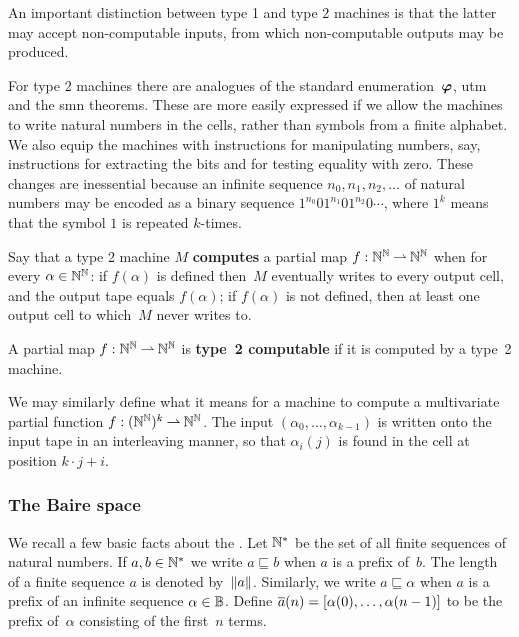 An important distinction between type 1 and type 2 machines is that
the latter may accept non-computable inputs, from which non-computable
outputs may be produced.

For type 2 machines there are analogues of the standard
enumeration~$\text{\boldmath{$\varphi$}}$, utm and the smn theorems. These are more easily
expressed if we allow the machines to write natural numbers in the
cells, rather than symbols from a finite alphabet. We also equip the
machines with instructions for manipulating numbers, say, instructions
for extracting the bits and for testing equality with zero. These
changes are inessential because an infinite sequence $n_0, n_1, n_2,
\ldots$ of natural numbers may be encoded as a binary sequence
$1^{n_0}01^{n_1}01^{n_2}0\cdots$, where $1^k$ means that the symbol
$1$ is repeated $k$-times.

\begin{definition}
  Say that a type 2 machine $M$ \textbf{computes} a partial map $f : \mathbb{N}^{\mathbb{N}} \mathbin{\rightharpoonup}
  \mathbb{N}^{\mathbb{N}}$ when for every $\alpha \in \mathbb{N}^{\mathbb{N}}$:
  if $f(\alpha)$ is defined then~$M$ eventually writes to every output cell, and the output tape equals $f(\alpha)$; if $f(\alpha)$ is not defined, then at least one output cell to which~$M$ never writes to.

  A partial map $f : \mathbb{N}^{\mathbb{N}} \mathbin{\rightharpoonup} \mathbb{N}^{\mathbb{N}}$ is \textbf{type~2 computable} if it is computed by a type~2 machine.
\end{definition}

We may similarly define what it means for a machine to compute a multivariate partial function $f : (\mathbb{N}^{\mathbb{N}})^k \mathbin{\rightharpoonup} \mathbb{N}^{\mathbb{N}}$. The input $(\alpha_0, \ldots, \alpha_{k-1})$ is written onto the input tape in an interleaving manner, so that $\alpha_i(j)$ is found in the cell at position $k \cdot j + i$.

\subsubsection{The Baire space}
\label{sec:baire-space}

We recall a few basic facts about the . Let $\mathbb{N}^{*}$ be the set of all finite sequences of natural numbers. If $a, b \in \mathbb{N}^{*}$
we write $a \sqsubseteq b$ when $a$ is a prefix of~$b$. The length of a finite sequence $a$ is denoted by~$\|a\|$. Similarly, we write $a \sqsubseteq \alpha$ when $a$ is a prefix of an infinite sequence $\alpha \in \mathbb{B}$. Define $\overline{a}(n) = [\alpha(0), \ldots,
\alpha(n-1)]$ to be the prefix of~$\alpha$ consisting of the first~$n$ terms.

